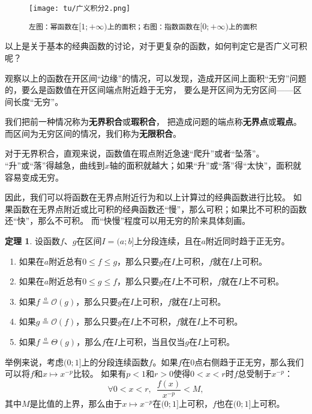 \documentclass[12pt,UTF8]{ctexbook}
\newcommand{\oveq}[1]{\overset{#1}{=}}   %
\newcommand{\Olim}[1]{\mathcal{O}\left(#1\right)}  %
\newcommand{\Tlim}[1]{\mathcal{\Theta}\left(#1\right)}  %
\theoremstyle{definition}
\newtheorem{tm}{定理}[section]
\theoremstyle{plain}
\begin{document}
\begin{figure}[h] %
    \vspace{4pt}
    \centering
    \texttt{[image: tu/广义积分2.png]}
    \caption*{\texttt{左图：幂函数在}$[1;+\infty)$\texttt{上的面积；右图：指数函数在}$[0;+\infty)$\texttt{上的面积}}
\end{figure}

以上是关于基本的经典函数的讨论，对于更复杂的函数，如何判定它是否广义可积呢？

观察以上的函数在开区间“边缘”的情况，可以发现，造成开区间上面积“无穷”问题的，要么是函数值在开区间端点附近趋于无穷，
要么是开区间为无穷区间——区间长度“无穷”。

我们把前一种情况称为\textbf{无界积合}或\textbf{瑕积合}，
把造成问题的端点称\textbf{无界点}或\textbf{瑕点}。而区间为无穷区间的情况，我们称为\textbf{无限积合}。

对于无界积合，直观来说，函数值在瑕点附近急速“爬升”或者“坠落”。
“升”或“落”得越急，曲线到$x$轴的面积就越大；如果“升”或“落”得“太快”，面积就容易变成无穷。

因此，我们可以将函数在无界点附近行为和以上计算过的经典函数进行比较。
如果函数在无界点附近或比可积的经典函数还“慢”，那么可积；如果比不可积的函数还“快”，那么不可积。
而“快慢”程度可以用无穷的阶来具体刻画。

\begin{tm}
    设函数$f$、$g$在区间$I=(a;b]$上分段连续，且在$a$附近同时趋于正无穷。
    \begin{enumerate}
        \item 如果在$a$附近总有$0\leqslant f \leqslant g$，那么只要$g$在$I$上可积，$f$就在$I$上可积。
        \item 如果在$a$附近总有$0\leqslant g \leqslant f$，那么只要$g$在$I$上不可积，$f$就在$I$上不可积。
        \item 如果$f \oveq{a} \Olim{g}$，那么只要$g$在$I$上可积，$f$就在$I$上可积。
        \item 如果$g \oveq{a} \Olim{f}$，那么只要$g$在$I$上不可积，$f$就在$I$上不可积。
        \item 如果$f \oveq{a} \Tlim{g}$，那么$f$在$I$上可积，当且仅当$g$在$I$上可积。
    \end{enumerate}
\end{tm}

举例来说，考虑$(0;1]$上的分段连续函数$f$。如果$f$在$0$点右侧趋于正无穷，那么我们可以将$f$和$x\mapsto x^{-p}$比较。
如果有$p<1$和$r>0$使得$0<x<r$时$f$总受制于$x^{-p}$：
$$ \forall 0<x<r ,\,\,\,\frac{f(x)}{x^{-p}} < M,$$
其中$M$是比值的上界，那么由于$x\mapsto x^{-p}$在$(0;1]$上可积，$f$也在$(0;1]$上可积。
\end{document}
